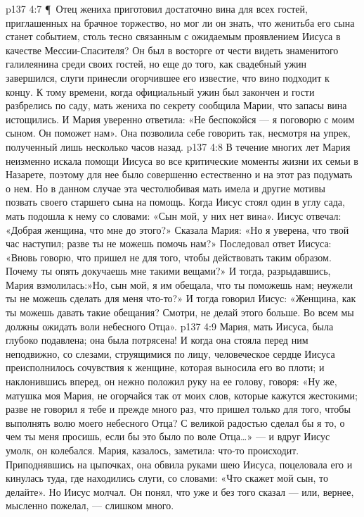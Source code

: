 \vs p137 4:7 \P\ Отец жениха приготовил достаточно вина для всех гостей, приглашенных на брачное торжество, но мог ли он знать, что женитьба его сына станет событием, столь тесно связанным с ожидаемым проявлением Иисуса в качестве Мессии\hyp{}Спасителя? Он был в восторге от чести видеть знаменитого галилеянина среди своих гостей, но еще до того, как свадебный ужин завершился, слуги принесли огорчившее его известие, что вино подходит к концу. К тому времени, когда официальный ужин был закончен и гости разбрелись по саду, мать жениха по секрету сообщила Марии, что запасы вина истощились. И Мария уверенно ответила: «Не беспокойся --- я поговорю с моим сыном. Он поможет нам». Она позволила себе говорить так, несмотря на упрек, полученный лишь несколько часов назад.
\vs p137 4:8 В течение многих лет Мария неизменно искала помощи Иисуса во все критические моменты жизни их семьи в Назарете, поэтому для нее было совершенно естественно и на этот раз подумать о нем. Но в данном случае эта честолюбивая мать имела и другие мотивы позвать своего старшего сына на помощь. Когда Иисус стоял один в углу сада, мать подошла к нему со словами: «Сын мой, у них нет вина». Иисус отвечал: «Добрая женщина, что мне до этого?» Сказала Мария: «Но я уверена, что твой час наступил; разве ты не можешь помочь нам?» Последовал ответ Иисуса: «Вновь говорю, что пришел не для того, чтобы действовать таким образом. Почему ты опять докучаешь мне такими вещами?» И тогда, разрыдавшись, Мария взмолилась:»Но, сын мой, я им обещала, что ты поможешь нам; неужели ты не можешь сделать для меня что\hyp{}то?» И тогда говорил Иисус: «Женщина, как ты можешь давать такие обещания? Смотри, не делай этого больше. Во всем мы должны ожидать воли небесного Отца».
\vs p137 4:9 Мария, мать Иисуса, была глубоко подавлена; она была потрясена! И когда она стояла перед ним неподвижно, со слезами, струящимися по лицу, человеческое сердце Иисуса преисполнилось сочувствия к женщине, которая выносила его во плоти; и наклонившись вперед, он нежно положил руку на ее голову, говоря: «Ну же, матушка моя Мария, не огорчайся так от моих слов, которые кажутся жестокими; разве не говорил я тебе и прежде много раз, что пришел только для того, чтобы выполнять волю моего небесного Отца? С великой радостью сделал бы я то, о чем ты меня просишь, если бы это было по воле Отца\ldots » --- и вдруг Иисус умолк, он колебался. Мария, казалось, заметила: что\hyp{}то происходит. Приподнявшись на цыпочках, она обвила руками шею Иисуса, поцеловала его и кинулась туда, где находились слуги, со словами: «Что скажет мой сын, то делайте». Но Иисус молчал. Он понял, что уже и без того сказал --- или, вернее, мысленно пожелал, --- слишком много.
